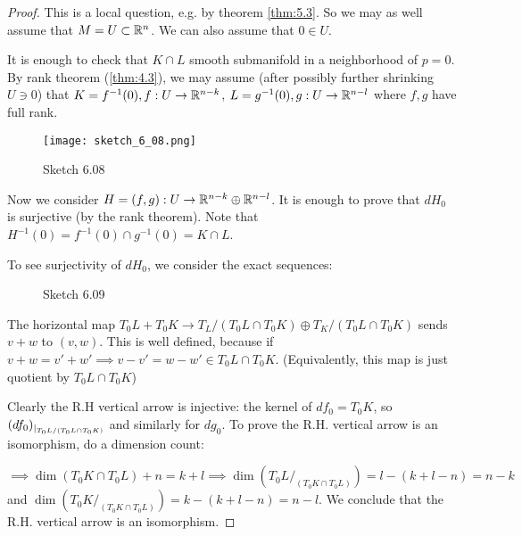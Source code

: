 \begin{proof}
    This is a local question, e.g. by theorem \ref{thm:5.3}. So we may as well assume that \(M=U\subset \mathbb{R}^n\).
    We can also assume that \(0\in U\).
    
    It is enough to check that \(K\cap L\) smooth submanifold in a neighborhood of \(p=0\). By rank theorem (\ref{thm:4.3}), we may assume 
    (after possibly further shrinking \(U\ni 0\)) that \(K=f^{-1}(0),f:U\to\mathbb{R}^{n-k}\),
    \(L=g^{-1}(0), g:U\to\mathbb{R}^{n-l}\) where \(f,g\) have full rank.

    \begin{figure}[H]
        \centering
        \texttt{[image: sketch\_6\_08.png]}
        \caption{Sketch 6.08}
    \end{figure}
    Now we consider \(H=(f,g):U\to \mathbb{R}^{n-k}\oplus \mathbb{R}^{n-l}\). It is enough to prove that \(dH_0\) is 
    surjective (by the rank theorem). Note that \(H^{-1}(0)=f^{-1}(0)\cap g^{-1}(0)=K\cap L\).

    To see surjectivity of \(dH_0\), we consider the exact sequences: 
    \begin{figure}[H]\label{fig:6.09}
        \centering
        \caption{Sketch 6.09}
    \end{figure}
    The horizontal map \(T_0 L + T_0 K\to T_L/(T_0L\cap T_0K)\oplus T_K/(T_0L\cap T_0K)\) sends \(v+w\)
    to \((v,w)\). This is well defined, because if \(v+w=v'+w'\implies v-v'=w-w'\in T_0L\cap T_0K\). (Equivalently, this map is 
    just quotient by \(T_0L\cap T_0K\))

    Clearly the R.H vertical arrow is injective: the kernel of \(df_0=T_0K\), so \((df_0)_{|_{T_0L/(T_0L\cap T_0K)}}\) and similarly for \(dg_0\).
    To prove the R.H. vertical arrow is an isomorphism, do a dimension count: 
    \begin{center}
    \end{center}
    \(\implies \dim(T_0K\cap T_0L)+n=k+l\implies \dim(T_0L/_{(T_0K\cap T_0L)})=l-(k+l-n)=n-k\) and \(\dim(T_0K/_{(T_0K\cap T_0L)})=k-(k+l-n)=n-l\).
    We conclude that the R.H. vertical arrow is an isomorphism. 
\end{proof}

